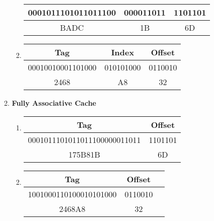 \documentclass[a4paper, 12pt, margins=2cm]{homework}
\begin{document}
\begin{solution}
\begin{enumerate}[label=(\alph*)]
\begin{enumerate}[label=(\arabic*)]
\begin{enumerate}[label=(\arabic*)]
\begin{center}
\begin{tabular}{|c|c|c|}
                  0001011101011011100 & 000011011 & 1101101 \\ \hline
                  BADC                & 1B        & 6D      \\ \hline
                \end{tabular}
              \end{center}
            \item \hfill
              \begin{center}
                \begin{tabular}{|c|c|c|}
                  \hline
                  Tag               & Index     & Offset  \\ \hline \hline
                  00010010001101000 & 010101000 & 0110010 \\ \hline
                  2468              & A8        & 32      \\ \hline
                \end{tabular}
              \end{center}
          \end{enumerate}
        \item \textbf{Fully Associative Cache}
          \begin{enumerate}[label=(\arabic*)]\itemsep0pt
            \item \hfill
              \begin{center}
                \begin{tabular}{|c|c|}
                  \hline
                  Tag                          & Offset  \\ \hline \hline
                  0001011101011011100000011011 & 1101101 \\ \hline
                  175B81B                      & 6D      \\ \hline
                \end{tabular}
              \end{center}
            \item \hfill
              \begin{center}
                \begin{tabular}{|c|c|c|}
                  \hline
                  Tag                    & Offset  \\ \hline \hline
                  1001000110100010101000 & 0110010 \\ \hline
                  2468A8                 & 32      \\ \hline
                \end{tabular}
              \end{center}
          \end{enumerate}
      \end{enumerate}
        

\end{enumerate}
\end{solution}
\end{document}
